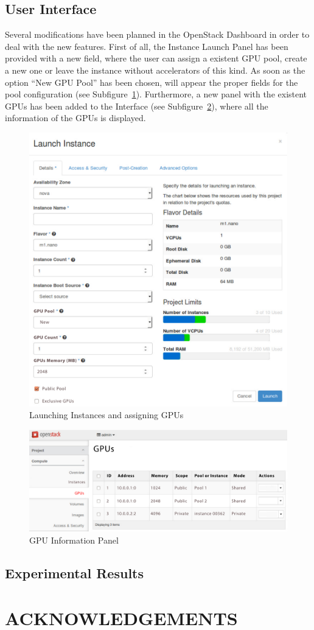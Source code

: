 \documentclass[a4paper,twoside]{article}
\begin{document}
\subsection{User Interface}
Several modifications have been planned in the OpenStack Dashboard in order to deal with the new features.
First of all, the Instance Launch Panel has been provided with a new field, where the user can assign a existent GPU pool, create a new one or leave the instance without accelerators of this kind.
As soon as the option ``New GPU Pool'' has been chosen, will appear the proper fields for the pool configuration (see Subfigure~\ref{fig:ui-launch}).
Furthermore, a new panel with the existent GPUs has been added to the Interface (see Subfigure~\ref{fig:ui-rgpus}), where all the information of the GPUs is displayed.

\begin{figure}[!t]
  \centering
  \includegraphics[width=.9\linewidth]{images/UI-launch.pdf}
  \caption{Launching Instances and assigning GPUs}
  \label{fig:ui-launch}
\end{figure}
  
\begin{figure}[!t]
  \centering
  \includegraphics[width=.85\linewidth]{images/UI-rgpus.pdf}
  \caption{GPU Information Panel}
  \label{fig:ui-rgpus}
\end{figure}

\subsection{Experimental Results}


\section*{\uppercase{Acknowledgements}}


{\small
}
\end{document}
